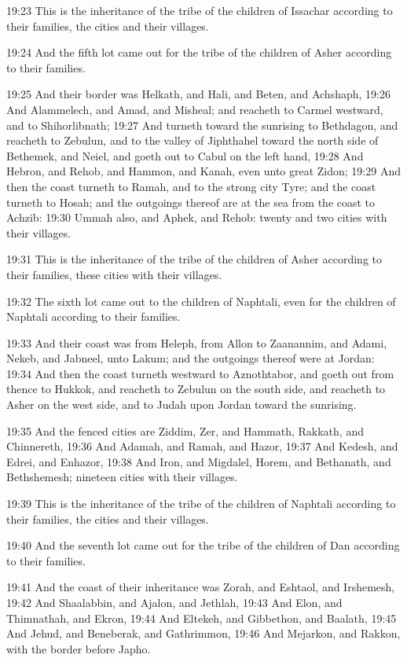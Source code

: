 19:23 This is the inheritance of the tribe of the children of Issachar according to their families, the cities and their villages.

19:24 And the fifth lot came out for the tribe of the children of Asher according to their families.

19:25 And their border was Helkath, and Hali, and Beten, and Achshaph, 19:26 And Alammelech, and Amad, and Misheal; and reacheth to Carmel westward, and to Shihorlibnath; 19:27 And turneth toward the sunrising to Bethdagon, and reacheth to Zebulun, and to the valley of Jiphthahel toward the north side of Bethemek, and Neiel, and goeth out to Cabul on the left hand, 19:28 And Hebron, and Rehob, and Hammon, and Kanah, even unto great Zidon; 19:29 And then the coast turneth to Ramah, and to the strong city Tyre; and the coast turneth to Hosah; and the outgoings thereof are at the sea from the coast to Achzib: 19:30 Ummah also, and Aphek, and Rehob: twenty and two cities with their villages.

19:31 This is the inheritance of the tribe of the children of Asher according to their families, these cities with their villages.

19:32 The sixth lot came out to the children of Naphtali, even for the children of Naphtali according to their families.

19:33 And their coast was from Heleph, from Allon to Zaanannim, and Adami, Nekeb, and Jabneel, unto Lakum; and the outgoings thereof were at Jordan: 19:34 And then the coast turneth westward to Aznothtabor, and goeth out from thence to Hukkok, and reacheth to Zebulun on the south side, and reacheth to Asher on the west side, and to Judah upon Jordan toward the sunrising.

19:35 And the fenced cities are Ziddim, Zer, and Hammath, Rakkath, and Chinnereth, 19:36 And Adamah, and Ramah, and Hazor, 19:37 And Kedesh, and Edrei, and Enhazor, 19:38 And Iron, and Migdalel, Horem, and Bethanath, and Bethshemesh; nineteen cities with their villages.

19:39 This is the inheritance of the tribe of the children of Naphtali according to their families, the cities and their villages.

19:40 And the seventh lot came out for the tribe of the children of Dan according to their families.

19:41 And the coast of their inheritance was Zorah, and Eshtaol, and Irshemesh, 19:42 And Shaalabbin, and Ajalon, and Jethlah, 19:43 And Elon, and Thimnathah, and Ekron, 19:44 And Eltekeh, and Gibbethon, and Baalath, 19:45 And Jehud, and Beneberak, and Gathrimmon, 19:46 And Mejarkon, and Rakkon, with the border before Japho.

